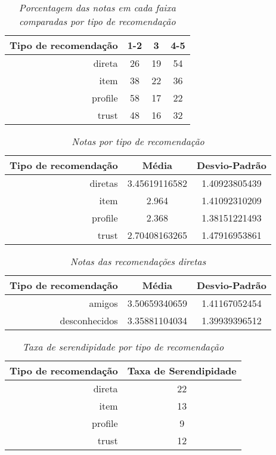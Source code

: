 \begin{table}
\centering
\begin{tabular}{|r|c|c|c|}
    \hline
    Tipo de recomendação & 1-2& 3& 4-5 \\
\hline 
direta & 26 & 19 & 54 \\
\hline 
item & 38 & 22 & 36 \\
\hline 
profile & 58 & 17 & 22 \\
\hline 
trust & 48 & 16 & 32 \\
\hline        
\end{tabular}
\caption{\it Porcentagem das notas em cada faixa comparadas por tipo de recomendação}
\label{table:notas}
\end{table}


\begin{table}
\centering
\begin{tabular}{|r|c|c|}
    \hline
    Tipo de recomendação & Média& Desvio-Padrão \\
\hline 
diretas & 3.45619116582 & 1.40923805439 \\
\hline 
item & 2.964 & 1.41092310209 \\
\hline 
profile & 2.368 & 1.38151221493 \\
\hline 
trust & 2.70408163265 & 1.47916953861 \\
\hline        
\end{tabular}
\caption{\it Notas por tipo de recomendação}
\label{table:notas_medias}
\end{table}


\begin{table}
\centering
\begin{tabular}{|r|c|c|}
    \hline
    Tipo de recomendação & Média& Desvio-Padrão \\
\hline 
amigos & 3.50659340659 & 1.41167052454 \\
\hline 
desconhecidos & 3.35881104034 & 1.39939396512 \\
\hline        
\end{tabular}
\caption{\it Notas das recomendações diretas}
\label{table:notas_medias_diretas}
\end{table}


\begin{table}
\centering
\begin{tabular}{|r|c|}
    \hline
    Tipo de recomendação & Taxa de Serendipidade \\
\hline 
direta & 22 \\
\hline 
item & 13 \\
\hline 
profile & 9 \\
\hline 
trust & 12 \\
\hline        
\end{tabular}
\caption{\it Taxa de serendipidade por tipo de recomendação}
\label{table:serendipidade}
\end{table}



